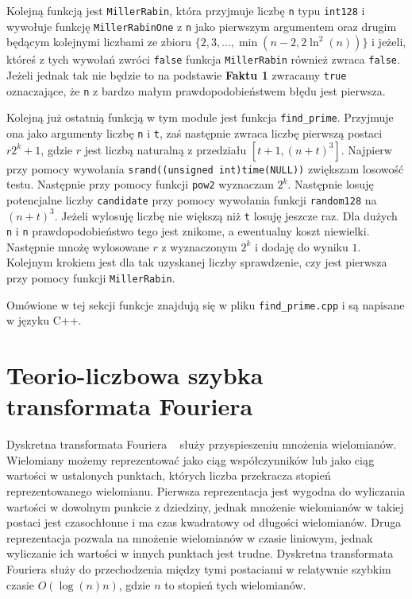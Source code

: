 \documentclass{article}
\begin{document}
Kolejną funkcją jest \texttt{MillerRabin}, która przyjmuje liczbę \texttt{n} typu \texttt{\texttt{\textunderscore \textunderscore int128}} i 
wywołuje funkcję \texttt{MillerRabinOne} z \texttt{n} jako pierwszym argumentem oraz drugim będącym kolejnymi liczbami ze zbioru
$\{2,3,...,\min(n-2, 2\ln^2(n))\}$ i jeżeli, któreś z tych wywołań zwróci \texttt{false} funkcja \texttt{MillerRabin} również 
zwraca \texttt{false}. Jeżeli jednak tak nie będzie to na podstawie \textbf{Faktu 1} zwracamy \texttt{true} oznaczające, że 
\texttt{n} z bardzo małym prawdopodobieństwem błędu jest pierwsza. 

Kolejną już ostatnią funkcją w tym module jest funkcja \texttt{find\_prime}. Przyjmuje ona jako argumenty liczbę \texttt{n} i 
\texttt{t}, zaś następnie zwraca liczbę pierwszą postaci $r2^k+1$, gdzie $r$ jest liczbą naturalną z przedziału $[t+1,(n+t)^3]$.
Najpierw przy pomocy wywołania \texttt{srand((unsigned int)time(NULL))} zwiększam losowość testu. 
Następnie przy pomocy funkcji \texttt{pow2} wyznaczam $2^k$. Następnie losuję potencjalne liczby \texttt{candidate} przy pomocy wywołania
funkcji \texttt{random128} na $(n+t)^3$. Jeżeli wylosuję liczbę nie większą niż \texttt{t} losuję jeszcze raz. Dla dużych \texttt{n} i \texttt{n}
prawdopodobieństwo tego jest znikome, a ewentualny koszt niewielki. Następnie mnożę
wylosowane $r$ z wyznaczonym $2^k$ i dodaję do wyniku $1$. Kolejnym krokiem jest dla tak uzyskanej liczby sprawdzenie, czy 
jest pierwsza przy pomocy funkcji \texttt{MillerRabin}.

Omówione w tej sekcji funkcje znajdują się w pliku \texttt{find\_prime.cpp} i są napisane w języku C++.



\section{Teorio-liczbowa szybka transformata Fouriera}

Dyskretna transformata Fouriera ~\cite{wang1984fast} służy przyspieszeniu mnożenia wielomianów. 
Wielomiany możemy reprezentować jako ciąg współczynników lub jako ciąg wartości w ustalonych punktach, 
których liczba przekracza stopień reprezentowanego wielomianu. Pierwsza reprezentacja jest wygodna
do wyliczania wartości w dowolnym punkcie z dziedziny, jednak mnożenie wielomianów w takiej postaci
jest czasochłonne i ma czas kwadratowy od długości wielomianów. Druga reprezentacja pozwala na 
mnożenie wielomianów w czasie liniowym, jednak wyliczanie ich wartości w innych punktach jest
trudne. Dyskretna transformata Fouriera służy do przechodzenia między tymi postaciami w 
relatywnie szybkim czasie $O(\log(n)n)$, gdzie $n$ to stopień tych wielomianów.
\end{document}
